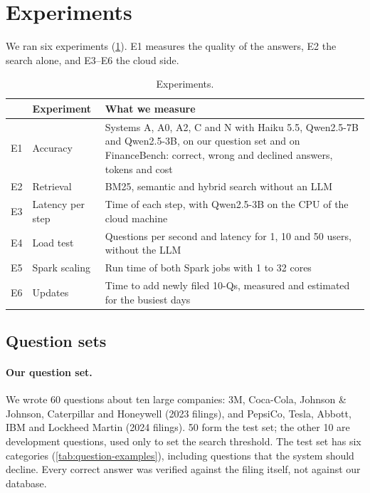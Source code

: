 \section{Experiments}

We ran six experiments (\cref{tab:experiments}). E1 measures the quality of the answers, E2 the
search alone, and E3--E6 the cloud side.

\begin{table}[ht]
\centering\small
\begin{tabularx}{\linewidth}{llX}
\toprule
 & Experiment & What we measure \\
\midrule
E1 & Accuracy & Systems A, A0, A2, C and N with Haiku 5.5, Qwen2.5-7B and Qwen2.5-3B, on our question
              set and on FinanceBench: correct, wrong and declined answers, tokens and cost \\
E2 & Retrieval & BM25, semantic and hybrid search without an LLM \\
E3 & Latency per step & Time of each step, with Qwen2.5-3B on the CPU of the cloud machine \\
E4 & Load test & Questions per second and latency for 1, 10 and 50 users, without the LLM \\
E5 & Spark scaling & Run time of both Spark jobs with 1 to 32 cores \\
E6 & Updates & Time to add newly filed 10-Qs, measured and estimated for the busiest days \\
\bottomrule
\end{tabularx}
\caption{Experiments.}
\label{tab:experiments}
\end{table}

\subsection{Question sets}

\paragraph{Our question set.} We wrote 60 questions about ten large companies: 3M, Coca-Cola,
Johnson \& Johnson, Caterpillar and Honeywell (2023 filings), and PepsiCo, Tesla, Abbott, IBM and
Lockheed Martin (2024 filings). 50 form the test set; the other 10 are development questions, used
only to set the search threshold. The test set has six categories (\cref{tab:question-examples}),
including questions that the system should decline. Every correct answer was verified against the
filing itself, not against our database.

